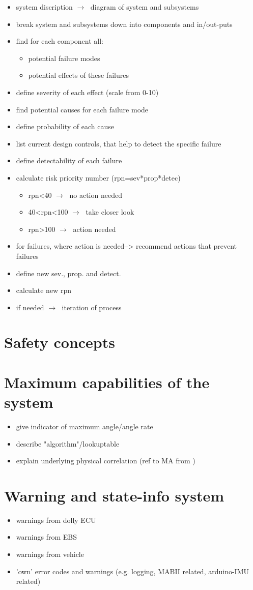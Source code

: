 \documentclass[ExampleMasters.tex]{subfiles}
\begin{document}
\begin{itemize}
	\item system discription $\rightarrow\;$ diagram of system and subsystems
	\item break system and subsystems down into components and in/out-puts
	\item find for each component all:
	\begin{itemize}
		\item potential failure modes
		\item potential effects of these failures
	\end{itemize}
	\item define severity of each effect (scale from 0-10)
	\item find potential causes for each failure mode
	\item define probability of each cause
	\item list current design controls, that help to detect the specific failure
	\item define detectability of each failure
	\item calculate risk priority number (rpn=sev*prop*detec)
	\begin{itemize}
		\item rpn<40 $\rightarrow\;$ no action needed
		\item 40<rpn<100 $\rightarrow\;$ take closer look
		\item rpn>100 $\rightarrow\;$ action needed
	\end{itemize}
	\item for failures, where action is needed--> recommend actions that prevent failures
	\item define new sev., prop. and detect.
	\item calculate new rpn
	\item if needed $\rightarrow\;$ iteration of process    
\end{itemize}
\section{Safety concepts}
\label{sec:safetyconcepts}

\section{Maximum capabilities of the system}
\label{sec:maxi_capabilities}
\begin{itemize}
	\item give indicator of maximum angle/angle rate
	\item describe "algorithm"/lookuptable
	\item explain underlying physical correlation (ref to MA from )
\end{itemize}

\section{Warning and state-info system}
\label{sec:warning_system}
\begin{itemize}
	\item warnings from dolly ECU
	\item warnings from EBS
	\item warnings from vehicle
	\item 'own' error codes and warnings (e.g. logging, MABII related, arduino-IMU related)
\end{itemize}
\end{document}

